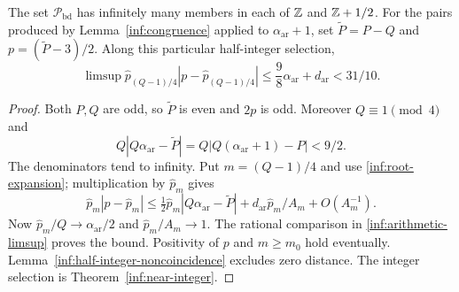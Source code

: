 \begin{lemma}\label{inf:shifted-arithmetic}
The set $\mathcal P_{\mathrm{bd}}$ has infinitely many members in each
of $\mathbb{Z}$ and $\mathbb{Z}+1/2$. For the pairs produced by
Lemma~\ref{inf:congruence} applied to $\alpha_{\mathrm{ar}}+1$, set
$\widetilde P=P-Q$ and $p=(\widetilde P-3)/2$. Along this particular
half-integer selection,
\[
 \limsup\widehat p_{(Q-1)/4}|p-\widehat p_{(Q-1)/4}|
 \le\frac98\alpha_{\mathrm{ar}}+d_{\mathrm{ar}}<31/10.
\]
\end{lemma}
\begin{proof}
Both $P,Q$ are odd, so $\widetilde P$ is even and $2p$ is odd.
Moreover $Q\equiv1\pmod4$ and
\[
 Q|Q\alpha_{\mathrm{ar}}-\widetilde P|
 =Q|Q(\alpha_{\mathrm{ar}}+1)-P|<9/2.
\]
The denominators tend to infinity. Put $m=(Q-1)/4$ and use
\eqref{inf:root-expansion}; multiplication by $\widehat p_m$ gives
\[
 \widehat p_m|p-\widehat p_m|
 \le\tfrac12\widehat p_m|Q\alpha_{\mathrm{ar}}-\widetilde P|
       +d_{\mathrm{ar}}\widehat p_m/A_m+O(A_m^{-1}).
\]
Now $\widehat p_m/Q\to\alpha_{\mathrm{ar}}/2$ and
$\widehat p_m/A_m\to1$. The rational comparison in
\eqref{inf:arithmetic-limsup} proves the bound. Positivity of $p$ and
$m\ge m_0$ hold eventually. Lemma~\ref{inf:half-integer-noncoincidence}
excludes zero distance. The integer selection is
Theorem~\ref{inf:near-integer}.
\end{proof}

